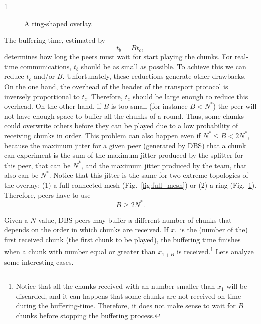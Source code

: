 1%


\begin{figure}
  \centering
  \vbox{}
  \caption{A ring-shaped overlay.}
  \label{fig:ring}
\end{figure}

\label{sec:buffering_time}
The buffering-time, estimated by
\begin{equation}
  \label{eq:t_b}
  t_b = Bt_c,  %
\end{equation}
determines how long the peers must wait for start playing the
chunks. For real-time communications, $t_b$ should be as small as
possible. To achieve this we can reduce $t_c$ and/or
$B$. Unfortunately, these reductions generate other drawbacks. On the
one hand, the overhead of the header of the transport protocol is
inversely proportional to $t_c$. Therefore, $t_c$ should be large
enough to reduce this overhead. On the other hand, if $B$ is too small
(for instance $B<N^*$) the peer will not have enough space to buffer
all the chunks of a round. Thus, some chunks could overwrite others
before they can be played due to a low probability of receiving chunks
in order. This problem can also happen even if $N^*\leq B<2N^*$,
because the maximum jitter for a given peer (generated by DBS) that a
chunk can experiment is the sum of the maximum jitter produced by the
splitter for this peer, that can be $N^*$, and the maximum jitter
produced by the team, that also can be $N^*$. Notice that this jitter
is the same for two extreme topologies of the overlay: (1) a
full-connected mesh (Fig.~\ref{fig:full_mesh}) or (2) a ring
(Fig.~\ref{fig:ring}). Therefore, peers have to use
\begin{equation}
  \label{eq:minimum_B}
  B\ge 2N^*.
\end{equation}

Given a $N$ value, DBS peers may buffer a different number of chunks
that depends on the order in which chunks are received. If $x_1$ is
the (number of the) first received chunk (the first chunk to be
played), the buffering time finishes when a chunk with number equal or
greater than $x_{1+B}$ is received.\footnote{Notice that all the
  chunks received with an number smaller than $x_1$ will be discarded,
  and it can happens that some chunks
  are not received on time during the buffering-time. Therefore, it does not make sense to wait
  for $B$ chunks before stopping the buffering process.} Lets analyze
some interesting cases.

